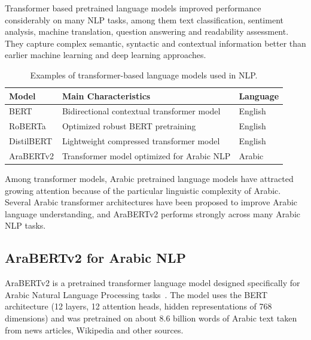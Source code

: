 Transformer based pretrained language models improved performance considerably on many NLP tasks, among them text classification, sentiment analysis, machine translation, question answering and readability assessment. They capture complex semantic, syntactic and contextual information better than earlier machine learning and deep learning approaches.
\begin{table}[H]

\centering

\caption{Examples of transformer-based language models used in NLP.}

\label{tab:transformer_models}

\begin{tabular}{p{4cm} p{6.5cm} p{2.5cm}}

\toprule

\textbf{Model} & \textbf{Main Characteristics} & \textbf{Language} \\

\midrule

BERT & Bidirectional contextual transformer model & English \\

RoBERTa & Optimized robust BERT pretraining & English \\

DistilBERT & Lightweight compressed transformer model & English \\

AraBERTv2 & Transformer model optimized for Arabic NLP & Arabic \\

\bottomrule

\end{tabular}

\end{table}
Among transformer models, Arabic pretrained language models have attracted growing attention because of the particular linguistic complexity of Arabic. Several Arabic transformer architectures have been proposed to improve Arabic language understanding, and AraBERTv2 performs strongly across many Arabic NLP tasks.

\subsection{AraBERTv2 for Arabic NLP}

AraBERTv2 is a pretrained transformer language model designed specifically for Arabic Natural Language Processing tasks~\cite{antoun2020arabert}. The model uses the BERT architecture (12 layers, 12 attention heads, hidden representations of 768 dimensions) and was pretrained on about 8.6 billion words of Arabic text taken from news articles, Wikipedia and other sources.

